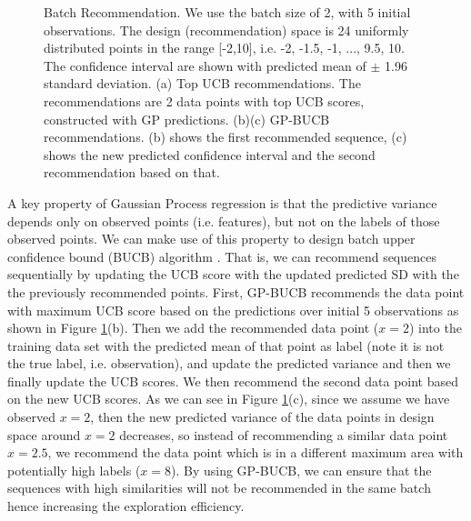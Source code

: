 \begin{figure}[t]
\begin{minipage}{.5\linewidth}
\end{minipage}
\caption{Batch Recommendation. We use the batch size of 2, with 5 initial observations. The design (recommendation) space is 24 uniformly distributed points in the range [-2,10], i.e. {-2, -1.5, -1, ..., 9.5, 10}.
The confidence interval are shown with predicted mean of $\pm$ 1.96 standard deviation.
(a) Top UCB recommendations. The recommendations are 2 data points with top UCB scores, constructed with GP predictions. 
(b)(c) GP-BUCB recommendations. (b) shows the first recommended sequence, (c) shows the new predicted confidence interval and the second recommendation based on that.}
\label{fig:batch rec}
\end{figure}


A key property of Gaussian Process regression is that the predictive variance  depends only on observed points (i.e. features), but not on the labels of those observed points. 
We can make use of this property to design batch upper confidence bound (BUCB) algorithm \cite{desautels2012parallelizing}.
That is, we can recommend sequences sequentially by updating the UCB score with the updated predicted SD with the the previously recommended points.
First, GP-BUCB  recommends the data point with maximum UCB score based on the predictions over initial 5 observations as shown in Figure \ref{fig:batch rec}(b).  
Then we add the recommended data point ($x = 2$) into the training data set with the predicted mean of that point as label (note it is not the true label, i.e. observation), and update the predicted variance and then we finally update the UCB scores. We then recommend the second data point based on the new UCB scores.   
As we can see in Figure \ref{fig:batch rec}(c), since we assume we have observed $x = 2$, then the new predicted variance of the data points in design space around $x =2$  decreases, so instead of recommending a similar data point $x = 2.5$, we recommend the data point which is in a different maximum area with potentially high labels ($x = 8$).     
By using GP-BUCB, we can ensure that the sequences with high similarities will not be recommended in the same batch hence increasing the exploration efficiency. 
